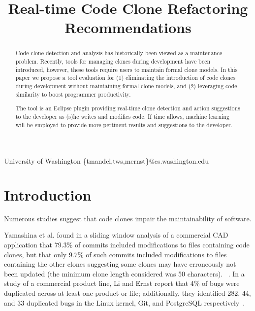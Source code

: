 \documentclass[preprint,10pt]{sigplanconf}
\begin{document}
%

\title{Real-time Code Clone Refactoring Recommendations}
           {University of Washington}
           {\{tmandel,tws,mernst\}@cs.washington.edu}

\maketitle
\begin{abstract}
Code clone detection and analysis has historically been viewed as a
maintenance problem. Recently, tools for managing clones during
development have been introduced, however, these tools require
users to maintain formal clone models.
In this paper we propose a tool evaluation for (1) eliminating the
introduction of code clones during development without maintaining formal clone models, and (2) leveraging code
similarity to boost programmer productivity.

The tool
is an Eclipse plugin providing real-time clone detection and action
suggestions to the developer as (s)he writes and modifies
code. If time allows, machine learning will be 
employed to provide more pertinent results
and suggestions to the developer.
\end{abstract}



\section{Introduction}
\label{sec:intro}
Numerous studies suggest that code clones impair the maintainability
of software.

Yamashina et al. found in a sliding window analysis of a commercial CAD
application that 79.3\% of commits included modifications to files
containing code clones, but that only 9.7\% of such commits included
modifications to files containing the other
clones suggesting some clones may have erroneously not been updated
(the minimum clone length considered was 50 characters).
~\cite{Yamashina2008}. 
In a study of a commercial product line, Li and Ernst report that 4\%
of bugs were duplicated across at least one product or file;
additionally, they identified 282, 44, and 33 duplicated bugs in the
Linux kernel, Git, and PostgreSQL respectively~\cite{LiE2011}.
\end{document}
